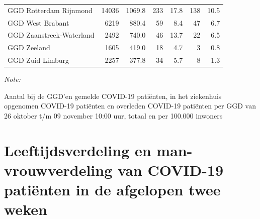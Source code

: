 \documentclass[
  english,
  man,floatsintext]{apa6}
\begin{document}
\begin{table}[H]
\begin{threeparttable}
\begin{tabular}{lrrrrrr}
GGD Rotterdam Rijnmond & 14036 & 1069.8 & 233 & 17.8 & 138 & 10.5\\
GGD West Brabant & 6219 & 880.4 & 59 & 8.4 & 47 & 6.7\\
GGD Zaanstreek-Waterland & 2492 & 740.0 & 46 & 13.7 & 22 & 6.5\\
GGD Zeeland & 1605 & 419.0 & 18 & 4.7 & 3 & 0.8\\
GGD Zuid Limburg & 2257 & 377.8 & 34 & 5.7 & 8 & 1.3\\
\bottomrule
\end{tabular}
\begin{tablenotes}
\item \textit{Note: } 
\item Aantal bij de GGD’en gemelde COVID-19 patiënten, in het ziekenhuis opgenomen COVID-19 patiënten en overleden COVID-19 patiënten per GGD van 26 oktober t/m 09 november 10:00 uur, totaal en per 100.000 inwoners
\end{tablenotes}
\end{threeparttable}
\endgroup{}
\end{table}

\newpage

\hypertarget{leeftijdsverdeling-en-man-vrouwverdeling-van-covid-19-patiuxebnten-in-de-afgelopen-twee-weken}{%
\section{Leeftijdsverdeling en man-vrouwverdeling van COVID-19 patiënten in de afgelopen twee weken}\label{leeftijdsverdeling-en-man-vrouwverdeling-van-covid-19-patiuxebnten-in-de-afgelopen-twee-weken}}
\end{document}
